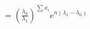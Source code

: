 \documentclass[preview]{standalone}
\begin{document}
\begin{align*}
= \left( \frac{\lambda_0}{\lambda_1} \right)^{\sum x_i} e^{n(\lambda_1-\lambda_0)}
\end{align*}
\end{document}
